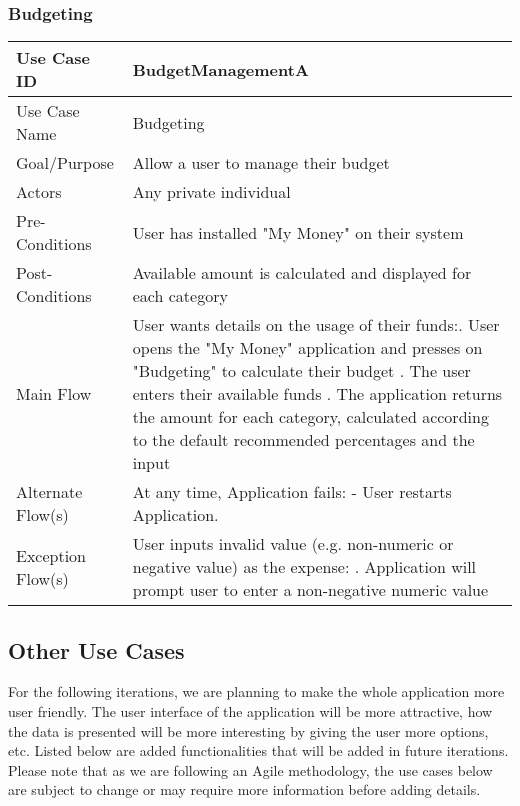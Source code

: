\documentclass[12pt]{article}
\begin{document}
\subsubsection{Budgeting} \label{uc:3}
\begin{center}
\begin{tabular}{| p{5cm} | p{10cm} |}
\hline

Use Case ID  & BudgetManagementA\\
\hline
Use Case Name  & Budgeting\\
\hline
Goal/Purpose  & Allow a user to manage their budget\\
\hline
Actors  & Any private individual\\
\hline
Pre-Conditions &  User has installed "My Money" on their system \\
\hline
Post-Conditions & Available amount is calculated and displayed for each category \\
\hline
Main Flow & User wants details on the usage of their funds:\newline
1.  User opens the "My Money" application and presses on "Budgeting" to calculate their budget \newline
2.  The user enters their available funds \newline
3. The application returns the amount for each category, calculated according to the default recommended percentages and the input\newline
\\
\hline
Alternate Flow(s) & 
At any time, Application fails: \newline
   - User restarts Application.
\\
\hline
Exception Flow(s) & User inputs invalid value (e.g. non-numeric or negative value) as the expense: \newline
1. Application will prompt user to enter a non-negative numeric value\\
\hline

\end{tabular}
\end{center}

\subsection{Other Use Cases}

For the following iterations, we are planning to make the whole application more user friendly. The user interface of the application will be more attractive, how the data is presented will be more interesting by giving the user more options, etc.
Listed below are added functionalities that will be added in future iterations.
Please note that as we are following an Agile methodology, the use cases below are subject to change or may require more information before adding details. 
\end{document}

